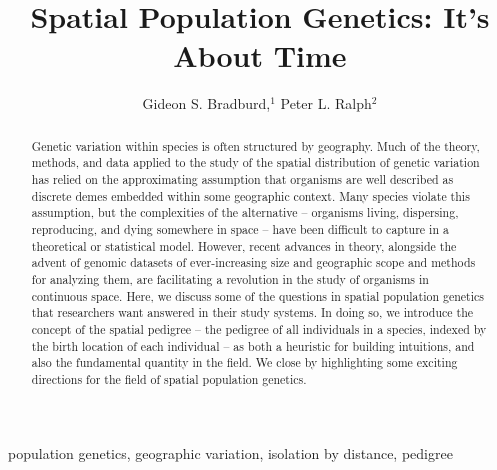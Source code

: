 \documentclass{ar-1col}
\begin{document}

\title{Spatial Population Genetics: It's About Time}


\author{Gideon S. Bradburd,$^1$ Peter L. Ralph$^2$
}

\begin{abstract}

Genetic variation within species is often structured by geography.
Much of the theory, methods, and data applied to the study 
of the spatial distribution of genetic variation 
has relied on the approximating assumption that 
organisms are well described as discrete demes  
embedded within some geographic context.
Many species violate this assumption, 
but the complexities of the alternative -- 
organisms living, dispersing, reproducing, and dying 
somewhere in space -- 
have been difficult to capture in a theoretical or statistical model.
However, recent advances in theory, 
alongside the advent of genomic datasets 
of ever-increasing size and geographic scope 
and methods for analyzing them,
are facilitating a revolution in the study of organisms in continuous space.
Here, we discuss some of the questions in spatial population genetics 
that researchers want answered in their study systems.
In doing so, we introduce the concept of the spatial pedigree -- 
the pedigree of all individuals in a species, 
indexed by the birth location of each individual
--
as both a heuristic for building intuitions, 
and also the fundamental quantity in the field.
We close by highlighting some exciting directions 
for the field of spatial population genetics.
\end{abstract}

\begin{keywords}
population genetics, geographic variation, isolation by distance, pedigree
\end{keywords}
\maketitle

\tableofcontents
\end{document}

